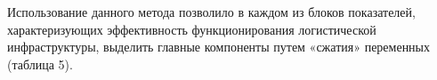 
Использование данного метода позволило в каждом из блоков показателей,
характеризующих эффективность функционирования логистической
инфраструктуры, выделить главные компоненты путем «сжатия» переменных
(таблица 5).

